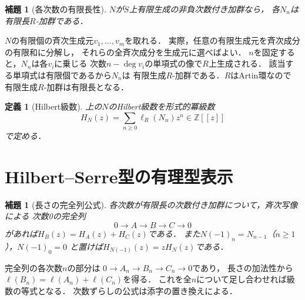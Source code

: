 \documentclass[a5paper,10pt,onecolumn]{jsarticle}
\makeatletter
\theoremstyle{mathnotetheorem}
\newtheorem{definition}[theorem]{定義}
\newtheorem{lemma}[theorem]{補題}
\renewcommand{\proofname}{証明}
\renewenvironment{proof}[1][\proofname]{%
  \par\pushQED{\qed}\normalfont\topsep4\p@\@plus2\p@\relax
  \trivlist\item[\hskip\labelsep\bfseries #1]\ignorespaces
}{\popQED\endtrivlist\@endpefalse}
\makeatother
\begin{document}
\begin{lemma}[各次数の有限長性]\label{hsam:lem:length}
$N$が$S$上有限生成の非負次数付き加群なら，
各$N_n$は有限長$R$-加群である．
\end{lemma}
\begin{proof}
$N$の有限個の斉次生成元$v_1,\ldots,v_m$を取れる．
実際，任意の有限生成元を斉次成分の有限和に分解し，
それらの全斉次成分を生成元に選べばよい．
$n$を固定すると，$N_n$は各$v_i$に乗じる
次数$n-\deg v_i$の単項式の像で$R$上生成される．
該当する単項式は有限個であるから$N_n$は
有限生成$R$-加群である．$R$はArtin環なので
有限生成$R$-加群は有限長となる．
\end{proof}

\begin{definition}[Hilbert級数]
上の$N$のHilbert級数を形式的冪級数
\[
 H_N(z)=\sum_{n\ge0}\ell_R(N_n)z^n\in\mathbb Z[[z]]
\]
で定める．
\end{definition}

\section{Hilbert--Serre型の有理型表示}
\begin{lemma}[長さの完全列公式]\label{hsam:lem:exact}
各次数が有限長の次数付き加群について，斉次写像による
次数0の完全列
\[
 0\longrightarrow A\longrightarrow B\longrightarrow C
 \longrightarrow0
\]
があれば$H_B(z)=H_A(z)+H_C(z)$である．
また$N(-1)_n=N_{n-1}$（$n\ge1$），$N(-1)_0=0$
と置けば$H_{N(-1)}(z)=zH_N(z)$である．
\end{lemma}
\begin{proof}
完全列の各次数$n$の部分は
$0\to A_n\to B_n\to C_n\to0$であり，
長さの加法性から$\ell(B_n)=\ell(A_n)+\ell(C_n)$を得る．
これを全$n$について足し合わせれば級数の等式となる．
次数ずらしの公式は添字の置き換えによる．
\end{proof}
\end{document}
